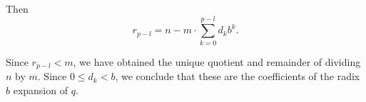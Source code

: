 \begin{defproof}
  Then
  \begin{equation*}
    r_{p-l} = n - m \cdot \sum_{k=0}^{p-l} d_k b^k.
  \end{equation*}

  Since \( r_{p-l} < m \), we have obtained the unique quotient and remainder of dividing \( n \) by \( m \). Since \( 0 \leq d_k < b \), we conclude that these are the coefficients of the radix \( b \) expansion of \( q \).
\end{defproof}
